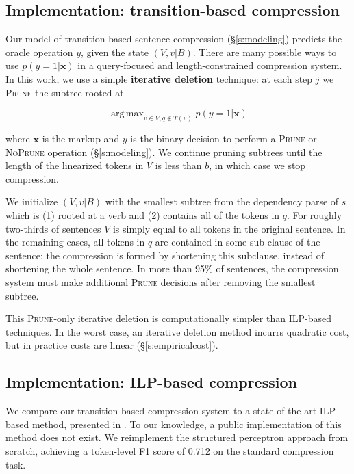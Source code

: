 \documentclass[11pt,a4paper]{article}
\DeclareMathOperator*{\argmaxA}{arg\,max} %
\begin{document}
\subsection{Implementation: transition-based compression}\label{s:transition}

Our model of transition-based sentence compression (\S\ref{s:modeling}) predicts the oracle operation $y$, given the state $(V,v|B)$. There are many possible ways to use $p(y=1| \bm{x})$ in a query-focused and length-constrained compression system. In this work, we use a simple \textbf{iterative deletion} technique: at each step $j$ we \textsc{Prune} the subtree rooted at 

$$\argmaxA_{v \in V,q\not\in T(v)}   p(y = 1 | \bm{x})$$

\noindent where $\bm{x}$ is the markup and $y$ is the binary decision to perform a \textsc{Prune} or \textsc{NoPrune} operation (\S\ref{s:modeling}). We continue pruning subtrees until the length of the linearized tokens in $V$ is less than $b$, in which case we stop compression. 

We initialize $(V, v|B)$ with the smallest subtree from the dependency parse of $s$ which is (1) rooted at a verb and (2) contains all of the tokens in $q$. For roughly two-thirds of sentences $V$ is simply equal to all tokens in the original sentence. In the remaining cases, all tokens in $q$ are contained in some sub-clause of the sentence; the compression is formed by shortening this subclause, instead of shortening the whole sentence. In more than 95\% of sentences, the compression system must make additional \textsc{Prune} decisions after removing the smallest subtree.

This \textsc{Prune}-only iterative deletion is computationally simpler than ILP-based techniques. In the worst case, an iterative deletion method incurrs quadratic cost, but in practice costs are linear (\S\ref{s:empiricalcost}).

\subsection{Implementation: ILP-based compression}\label{s:ilp}

We compare our transition-based compression system to a state-of-the-art ILP-based method, presented in \citet{filippova2013overcoming}. To our knowledge, a public implementation of this method does not exist. We reimplement the structured perceptron approach from scratch, achieving a token-level F1 score of  0.712 on the standard compression task. 
\end{document}
